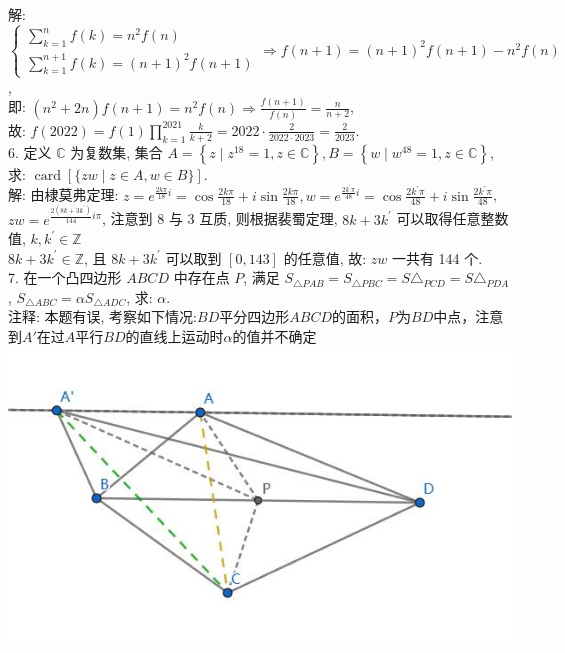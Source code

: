 \documentclass[a4paper,11pt,UTF8]{article}
\begin{document}
解: $\left\{\begin{array}{l}\displaystyle\sum_{k=1}^n f(k)=n^2 f(n) \\ \displaystyle\sum_{k=1}^{n+1} f(k)=(n+1)^2 f(n+1)\end{array} \Rightarrow f(n+1)=(n+1)^2 f(n+1)-n^2 f(n)\right.$,\\
即: $\displaystyle\left(n^2+2 n\right) f(n+1)=n^2 f(n) \Rightarrow \frac{f(n+1)}{f(n)}=\frac{n}{n+2}$,\\
故: $\displaystyle f(2022)=f(1) \prod_{k=1}^{2021} \frac{k}{k+2}=2022 \cdot \frac{2}{2022 \cdot 2023}=\frac{2}{2023}$.\\
6. 定义 $\mathbb{C}$ 为复数集, 集合 $A=\left\{z \mid z^{18}=1, z \in \mathbb{C}\right\}, B=\left\{w \mid w^{48}=1, z \in \mathbb{C}\right\}$,\\
求: $\operatorname{card}[\{z w \mid z \in A, w \in B\}]$.\\
解: 由棣莫弗定理: $\displaystyle z=e^{\frac{2 k \pi}{18} i}=\cos \frac{2 k \pi}{18}+i \sin \frac{2 k \pi}{18}, w=e^{\frac{2 k^{\prime} \pi}{48} i}=\cos \frac{2 k^{\prime} \pi}{48}+i \sin \frac{2 k^{\prime} \pi}{48}$,\\
$\displaystyle z w=e^{\frac{2\left(8 k+3 k^{\prime}\right)}{144} i \pi}$, 注意到 8 与 3 互质, 则根据裴蜀定理, $8 k+3 k^{\prime}$ 可以取得任意整数值, $k, k^{\prime} \in \mathbb{Z}$\\
$8 k+3 k^{\prime} \in \mathbb{Z}$, 且 $8 k+3 k^{\prime}$ 可以取到 $[0,143]$ 的任意值, 故: $z w$ 一共有 144 个.\\
7. 在一个凸四边形 $A B C D$ 中存在点 $P$, 满足 $S _{\triangle P A B}=S _{\triangle P B C}=S \triangle_{ P C D}=S \triangle _{P D A}$,
$S _{\triangle A B C}=\alpha S _{\triangle A D C}$, 求: $\alpha$.\\
注释: 本题有误, 考察如下情况:$BD$平分四边形$ABCD$的面积，$P$为$BD$中点，注意到$A'$在过$A$平行$BD$的直线上运动时$\alpha$的值并不确定\\
\includegraphics[scale=1]{./2022T7fig.jpg}
\end{document}
